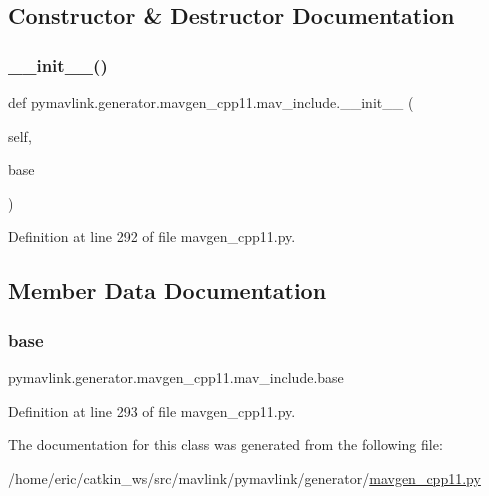 \subsection{Constructor \& Destructor Documentation}
\mbox{\label{classpymavlink_1_1generator_1_1mavgen__cpp11_1_1mav__include_a927802c78d2a11518f56ec6db923dd70}} 
\subsubsection{\texorpdfstring{\_\_init\_\_()}{\_\_init\_\_()}}
{\footnotesize\ttfamily def pymavlink.\+generator.\+mavgen\+\_\+cpp11.\+mav\+\_\+include.\+\_\+\+\_\+init\+\_\+\+\_\+ (\begin{DoxyParamCaption}\item[{}]{self,  }\item[{}]{base }\end{DoxyParamCaption})}



Definition at line 292 of file mavgen\+\_\+cpp11.\+py.



\subsection{Member Data Documentation}
\mbox{\label{classpymavlink_1_1generator_1_1mavgen__cpp11_1_1mav__include_ad3e828d0783a3571238a55aef8b94160}} 
\subsubsection{\texorpdfstring{base}{base}}
{\footnotesize\ttfamily pymavlink.\+generator.\+mavgen\+\_\+cpp11.\+mav\+\_\+include.\+base}



Definition at line 293 of file mavgen\+\_\+cpp11.\+py.



The documentation for this class was generated from the following file\+:\begin{DoxyCompactItemize}
\item 
/home/eric/catkin\+\_\+ws/src/mavlink/pymavlink/generator/\mbox{\hyperlink{mavgen__cpp11_8py}{mavgen\+\_\+cpp11.\+py}}\end{DoxyCompactItemize}

